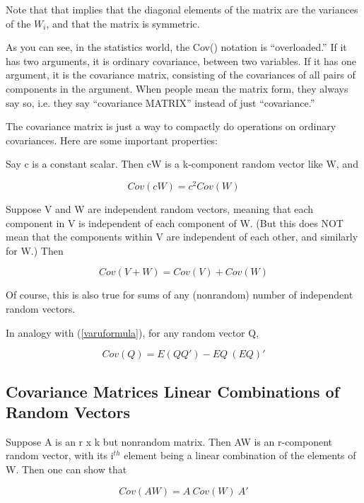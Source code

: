 Note that that implies that the diagonal elements of the matrix are the
variances of the $W_i$, and that the matrix is symmetric.  

As you can see, in the statistics world, the Cov() notation is
``overloaded.''  If it has two arguments, it is ordinary covariance,
between two variables.  If it has one argument, it is the covariance
matrix, consisting of the covariances of all pairs of components in the
argument.  When people mean the matrix form, they always say so, i.e.
they say ``covariance MATRIX'' instead of just ``covariance.''

The covariance matrix is just a way to compactly do operations on
ordinary covariances.  Here are some important properties:

Say c is a constant scalar.  Then cW is a
k-component random vector like W, and 

\begin{equation}
\label{c2cov}
Cov(cW) = c^2 Cov(W)
\end{equation}

Suppose V and W are independent random vectors, meaning that each
component in V is independent of each component of W.  (But this does
NOT mean that the components within V are independent of each other, and
similarly for W.)  Then

\begin{equation}
\label{vectorsumcov}
Cov(V + W) = Cov(V) + Cov(W) 
\end{equation}

Of course, this is also true for sums of any (nonrandom) number of
independent random vectors.

In analogy with (\ref{varuformula}), for any
random vector Q,

\begin{equation}
\label{quickcovarmat}
Cov(Q) = E(Q Q') - EQ ~ (EQ)'
\end{equation}

\subsection{Covariance Matrices Linear Combinations of Random Vectors}

Suppose A is an r x k but nonrandom matrix.  Then AW is an r-component
random vector, with its i$^{th}$ element being a linear combination of
the elements of W.  Then one can show that

\begin{equation}
\label{covawaprime}
Cov(AW) = A ~ Cov(W)  ~A'
\end{equation}

